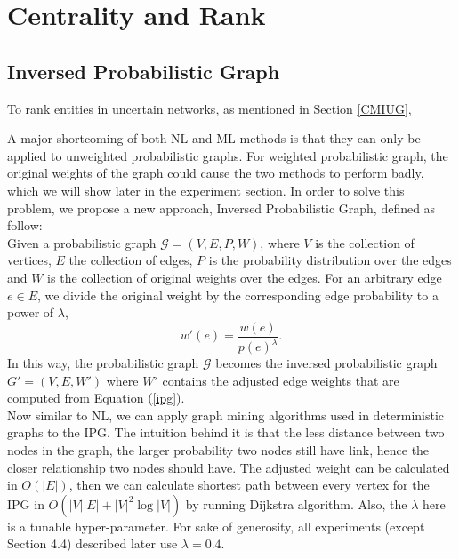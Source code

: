 \documentclass[\main/thesis.tex]{subfiles}
\begin{document}
\chapter{Centrality and Rank}

\section{Inversed Probabilistic Graph}
To rank entities in uncertain networks, as mentioned in Section \ref{CMIUG},

A major shortcoming of both NL and ML methods is that they can only be applied to unweighted probabilistic graphs. For weighted probabilistic graph, the original weights of the graph could cause the two methods to perform badly, which we will show later in the experiment section. In order to solve this problem, we propose a new approach, Inversed Probabilistic Graph, defined as follow:\\
Given a probabilistic graph $\mathcal{G} = (V, E, P, W )$, where $V$ is the collection of vertices, $E$ the collection of edges, $P$ is the probability distribution over the edges and $W$ is the collection of original weights over the edges. For an arbitrary edge $e \in E$, we divide the original weight by the corresponding edge probability to a power of $\lambda$,
\begin{equation}
w'(e) = \frac{w(e)}{p(e)^\lambda }. \label{ipg}
\end{equation}
In this way, the probabilistic graph $\mathcal{G}$ becomes the inversed probabilistic graph $G' = (V, E, W')$ where $W'$ contains the adjusted edge weights that are computed from Equation (\ref{ipg}).  \\
Now similar to NL, we can apply graph mining algorithms used in deterministic graphs to the IPG. The intuition behind it is that the less distance between two nodes in the graph, the larger probability two nodes still have link, hence the closer relationship two nodes should have. The adjusted weight can be calculated in $O(|E|)$, then we can calculate shortest path between every vertex for the IPG in $O(|V||E|+|V|^2 \log|V|)$ by running Dijkstra algorithm. Also, the $\lambda$ here is a tunable hyper-parameter. For sake of generosity, all experiments (except Section 4.4) described later use $\lambda = 0.4$. \\
\end{document}
